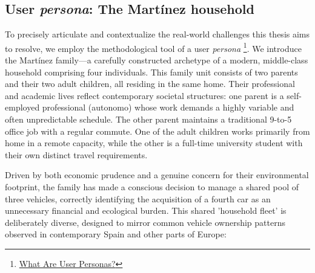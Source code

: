 \subsection{User \textit{persona}: The Martínez household}

To precisely articulate and contextualize the real-world challenges this thesis aims to resolve, we employ the methodological tool of a user \textit{persona} \footnote{\href{https://resources.scrumalliance.org/Article/user-personas}{What Are User Personas?}}. We introduce the Martínez family—a carefully constructed archetype of a modern, middle-class household comprising four individuals. This family unit consists of two parents and their two adult children, all residing in the same home. Their professional and academic lives reflect contemporary societal structures: one parent is a self-employed professional (\gls{autonomo}) whose work demands a highly variable and often unpredictable schedule. The other parent maintains a traditional 9-to-5 office job with a regular commute. One of the adult children works primarily from home in a remote capacity, while the other is a full-time university student with their own distinct travel requirements.

\textgap

Driven by both economic prudence and a genuine concern for their environmental footprint, the family has made a conscious decision to manage a shared pool of three vehicles, correctly identifying the acquisition of a fourth car as an unnecessary financial and ecological burden. This shared 'household fleet' is deliberately diverse, designed to mirror common vehicle ownership patterns observed in contemporary Spain and other parts of Europe:

